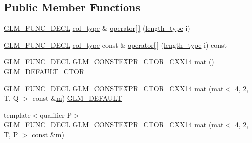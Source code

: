 \subsection*{Public Member Functions}
\begin{DoxyCompactItemize}
\item 
\hyperlink{setup_8hpp_ab2d052de21a70539923e9bcbf6e83a51}{G\+L\+M\+\_\+\+F\+U\+N\+C\+\_\+\+D\+E\+CL} \hyperlink{structglm_1_1mat_3_014_00_012_00_01_t_00_01_q_01_4_a60138ab077eb3bef96e654e672af5059}{col\+\_\+type} \& \hyperlink{structglm_1_1mat_3_014_00_012_00_01_t_00_01_q_01_4_ac3817abff98f5328dd58c18536a6a368}{operator\mbox{[}$\,$\mbox{]}} (\hyperlink{structglm_1_1mat_3_014_00_012_00_01_t_00_01_q_01_4_a4b192a2630331f70ca61657d9783026e}{length\+\_\+type} i)
\item 
\hyperlink{setup_8hpp_ab2d052de21a70539923e9bcbf6e83a51}{G\+L\+M\+\_\+\+F\+U\+N\+C\+\_\+\+D\+E\+CL} \hyperlink{structglm_1_1mat_3_014_00_012_00_01_t_00_01_q_01_4_a60138ab077eb3bef96e654e672af5059}{col\+\_\+type} const  \& \hyperlink{structglm_1_1mat_3_014_00_012_00_01_t_00_01_q_01_4_a93bfd9601db1127f3204daa428f627e6}{operator\mbox{[}$\,$\mbox{]}} (\hyperlink{structglm_1_1mat_3_014_00_012_00_01_t_00_01_q_01_4_a4b192a2630331f70ca61657d9783026e}{length\+\_\+type} i) const
\item 
\hyperlink{setup_8hpp_ab2d052de21a70539923e9bcbf6e83a51}{G\+L\+M\+\_\+\+F\+U\+N\+C\+\_\+\+D\+E\+CL} \hyperlink{setup_8hpp_a0900f9145e68bf6061b6f5e7be3fa751}{G\+L\+M\+\_\+\+C\+O\+N\+S\+T\+E\+X\+P\+R\+\_\+\+C\+T\+O\+R\+\_\+\+C\+X\+X14} \hyperlink{structglm_1_1mat_3_014_00_012_00_01_t_00_01_q_01_4_ad00ae33ce233ac098c9d6ff11fe709a7}{mat} () \hyperlink{setup_8hpp_afb97a4e995bc004c0cbbfa22125b80ba}{G\+L\+M\+\_\+\+D\+E\+F\+A\+U\+L\+T\+\_\+\+C\+T\+OR}
\item 
\hyperlink{setup_8hpp_ab2d052de21a70539923e9bcbf6e83a51}{G\+L\+M\+\_\+\+F\+U\+N\+C\+\_\+\+D\+E\+CL} \hyperlink{setup_8hpp_a0900f9145e68bf6061b6f5e7be3fa751}{G\+L\+M\+\_\+\+C\+O\+N\+S\+T\+E\+X\+P\+R\+\_\+\+C\+T\+O\+R\+\_\+\+C\+X\+X14} \hyperlink{structglm_1_1mat_3_014_00_012_00_01_t_00_01_q_01_4_a0713be6991a8f52680ba77634bc88c5b}{mat} (\hyperlink{structglm_1_1mat}{mat}$<$ 4, 2, T, Q $>$ const \&\hyperlink{_s_d_l__opengl__glext_8h_af593500c283bf1a787a6f947f503a5c2}{m}) \hyperlink{setup_8hpp_aefce7051c376a64ba89fa93a9f63bc2c}{G\+L\+M\+\_\+\+D\+E\+F\+A\+U\+LT}
\item 
{\footnotesize template$<$qualifier P$>$ }\\\hyperlink{setup_8hpp_ab2d052de21a70539923e9bcbf6e83a51}{G\+L\+M\+\_\+\+F\+U\+N\+C\+\_\+\+D\+E\+CL} \hyperlink{setup_8hpp_a0900f9145e68bf6061b6f5e7be3fa751}{G\+L\+M\+\_\+\+C\+O\+N\+S\+T\+E\+X\+P\+R\+\_\+\+C\+T\+O\+R\+\_\+\+C\+X\+X14} \hyperlink{structglm_1_1mat_3_014_00_012_00_01_t_00_01_q_01_4_ad435b5f1f4b1647655ec65a9a8517e20}{mat} (\hyperlink{structglm_1_1mat}{mat}$<$ 4, 2, T, P $>$ const \&\hyperlink{_s_d_l__opengl__glext_8h_af593500c283bf1a787a6f947f503a5c2}{m})

\end{DoxyCompactItemize}
